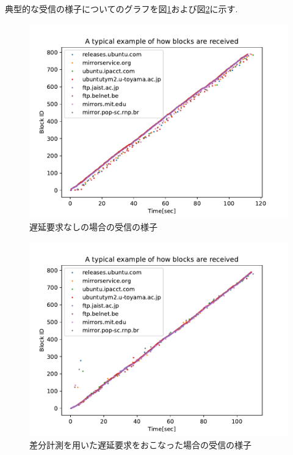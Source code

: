 \documentclass[a4j,12pt]{gradthesis_utf8}
\begin{document}
\newpage

典型的な受信の様子についてのグラフを図\ref{tpdnpub}および図\ref{tpddpub}に示す.

\begin{figure}[h]
	\begin{center}
		\includegraphics[width=11.9cm]{figure/TypicalPlotDelay=NORMALInit=FalseDup=IBRC.pdf}
		\caption{遅延要求なしの場合の受信の様子}
		\label{tpdnpub}
	\end{center}
\end{figure}

\begin{figure}[h]
	\begin{center}
		\includegraphics[width=11.9cm]{figure/TypicalPlotDelay=DIFFInit=TrueDup=IBRC.pdf}
		\caption{差分計測を用いた遅延要求をおこなった場合の受信の様子}
		\label{tpddpub}
	\end{center}
\end{figure}
\end{document}
